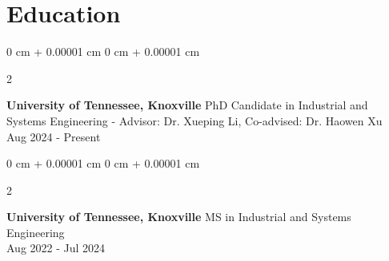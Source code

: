 \documentclass[10pt, letterpaper]{article}
\newenvironment{highlightsforbulletentries}{
    \begin{itemize}[
        topsep=0.10 cm,
        parsep=0.10 cm,
        partopsep=0pt,
        itemsep=0pt,
        leftmargin=10pt
    ]
}{
    \end{itemize}
} %
\newenvironment{onecolentry}{
    \begin{adjustwidth}{
        0 cm + 0.00001 cm
    }{
        0 cm + 0.00001 cm
    }
}{
    \end{adjustwidth}
} %
\newenvironment{twocolentry}[2][]{
    \onecolentry
    \def\secondColumn{#2}
    \setcolumnwidth{\fill, 4.5 cm}
    \begin{paracol}{2}
}{
    \switchcolumn \raggedleft \secondColumn
    \end{paracol}
    \endonecolentry
} %
\begin{document}



    










\section*{\small Education}
\begin{twocolentry}{Aug 2024 - Present}
    \small \textbf{University of Tennessee, Knoxville} \textbar PhD Candidate in Industrial and Systems Engineering - Advisor: Dr. Xueping Li, Co-advised: Dr. Haowen Xu \\
\end{twocolentry}

\begin{twocolentry}{Aug 2022 - Jul 2024}
    \small \textbf{University of Tennessee, Knoxville} \textbar MS in Industrial and Systems Engineering\\
\end{twocolentry}
\end{document}
